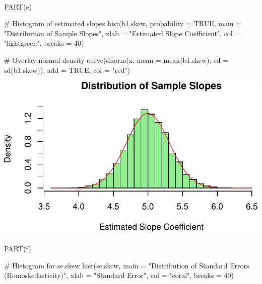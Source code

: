 \documentclass[
  11pt,
]{article}
\makeatletter
\let\oldparagraph\paragraph
\renewcommand{\paragraph}{
    \@ifstar
      \xxxParagraphStar
      \xxxParagraphNoStar
  }
\newcommand{\xxxParagraphStar}[1]{\oldparagraph*{#1}\mbox{}}
\newcommand{\xxxParagraphNoStar}[1]{\oldparagraph{#1}\mbox{}}
\newenvironment{Shaded}{\begin{snugshade}}{\end{snugshade}}
\newcommand{\AttributeTok}[1]{\textcolor[rgb]{0.40,0.45,0.13}{#1}}
\newcommand{\CommentTok}[1]{\textcolor[rgb]{0.37,0.37,0.37}{#1}}
\newcommand{\ConstantTok}[1]{\textcolor[rgb]{0.56,0.35,0.01}{#1}}
\newcommand{\DecValTok}[1]{\textcolor[rgb]{0.68,0.00,0.00}{#1}}
\newcommand{\FunctionTok}[1]{\textcolor[rgb]{0.28,0.35,0.67}{#1}}
\newcommand{\NormalTok}[1]{\textcolor[rgb]{0.00,0.23,0.31}{#1}}
\newcommand{\StringTok}[1]{\textcolor[rgb]{0.13,0.47,0.30}{#1}}
\makeatother
\begin{document}
\paragraph{PART(e)}\label{parte}

\begin{Shaded}
\begin{Highlighting}[]
\CommentTok{\# Histogram of estimated slopes}
\FunctionTok{hist}\NormalTok{(b1.skew, }\AttributeTok{probability =} \ConstantTok{TRUE}\NormalTok{, }
     \AttributeTok{main =} \StringTok{"Distribution of Sample Slopes"}\NormalTok{,}
     \AttributeTok{xlab =} \StringTok{"Estimated Slope Coefficient"}\NormalTok{, }\AttributeTok{col =} \StringTok{"lightgreen"}\NormalTok{, }\AttributeTok{breaks =} \DecValTok{40}\NormalTok{)}

\CommentTok{\# Overlay normal density}
\FunctionTok{curve}\NormalTok{(}\FunctionTok{dnorm}\NormalTok{(x, }\AttributeTok{mean =} \FunctionTok{mean}\NormalTok{(b1.skew), }\AttributeTok{sd =} \FunctionTok{sd}\NormalTok{(b1.skew)), }\AttributeTok{add =} \ConstantTok{TRUE}\NormalTok{, }\AttributeTok{col =} \StringTok{"red"}\NormalTok{)}
\end{Highlighting}
\end{Shaded}

\includegraphics{HW-4-CODE-and-ANSWERS_files/figure-pdf/unnamed-chunk-12-1.pdf}

\paragraph{PART(f)}\label{partf}

\begin{Shaded}
\begin{Highlighting}[]
\CommentTok{\# Histogram for se.skew}
\FunctionTok{hist}\NormalTok{(se.skew, }
     \AttributeTok{main =} \StringTok{"Distribution of Standard Errors (Homoskedasticity)"}\NormalTok{,}
     \AttributeTok{xlab =} \StringTok{"Standard Error"}\NormalTok{, }\AttributeTok{col =} \StringTok{"coral"}\NormalTok{, }\AttributeTok{breaks =} \DecValTok{40}\NormalTok{)}
\end{Highlighting}
\end{Shaded}
\end{document}

